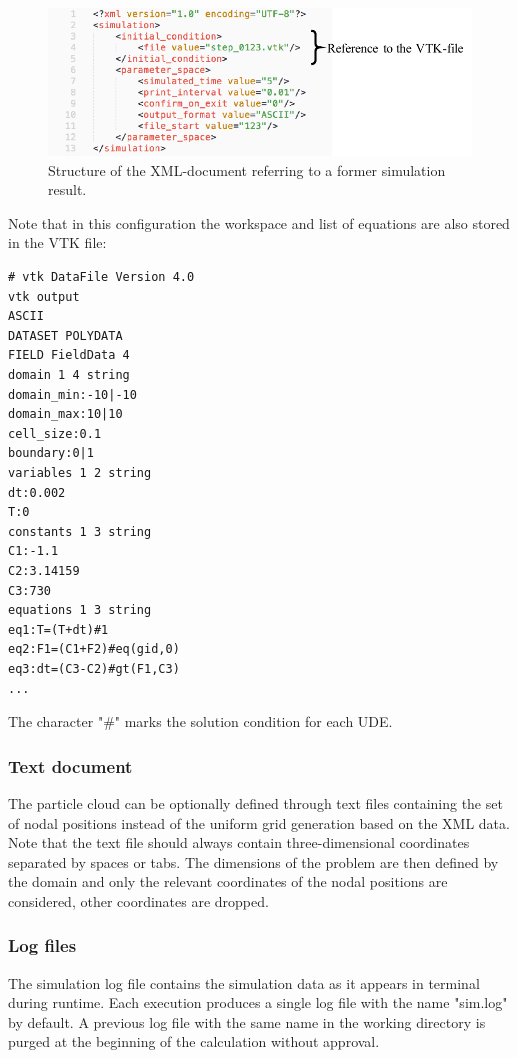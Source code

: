 \documentclass[a4paper,12pt,openany]{book}
\theoremstyle{break}
\begin{document}
\begin{figure}[h!]
  \includegraphics[scale=1]{xml_intro_simple.pdf}
  \centering
  \caption{Structure of the XML-document referring to a former simulation result.}
  \label{fig:xml_intro_simple}
\end{figure}\vspace*{3pt}
\newpage
Note that in this configuration the workspace and list of equations are also stored in the VTK file:\\
\begin{lstlisting}
# vtk DataFile Version 4.0
vtk output
ASCII
DATASET POLYDATA
FIELD FieldData 4
domain 1 4 string
domain_min:-10|-10
domain_max:10|10
cell_size:0.1
boundary:0|1
variables 1 2 string
dt:0.002
T:0
constants 1 3 string
C1:-1.1
C2:3.14159
C3:730
equations 1 3 string
eq1:T=(T+dt)#1
eq2:F1=(C1+F2)#eq(gid,0)
eq3:dt=(C3-C2)#gt(F1,C3)
...
\end{lstlisting}
The character "\#" marks the solution condition for each UDE.
\subsubsection{Text document}
The particle cloud can be optionally defined through text files containing the set of nodal positions instead of the uniform grid generation based on the XML data. Note that the text file should always contain three-dimensional coordinates separated by spaces or tabs. The dimensions of the problem are then defined by the domain and only the relevant coordinates of the nodal positions are considered, other coordinates are dropped.
\subsubsection{Log files}
The simulation log file contains the simulation data as it appears in terminal during runtime. Each execution produces a single log file with the name "sim.log" by default. A previous log file with the same name in the working directory is purged at the beginning of the calculation without approval.
\end{document}
